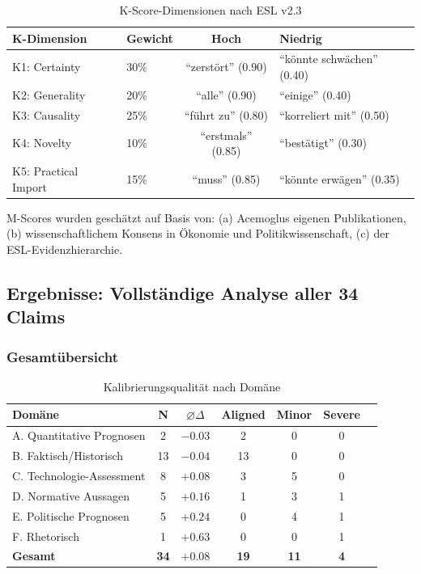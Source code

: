 \begin{table}[H]
\centering
\caption{K-Score-Dimensionen nach ESL v2.3}
\small
\begin{tabular}{llcl}
\toprule
\textbf{K-Dimension} & \textbf{Gewicht} & \textbf{Hoch} & \textbf{Niedrig} \\
\midrule
K1: Certainty & 30\% & ``zerst\"ort'' (0.90) & ``k\"onnte schw\"achen'' (0.40) \\
K2: Generality & 20\% & ``alle'' (0.90) & ``einige'' (0.40) \\
K3: Causality & 25\% & ``f\"uhrt zu'' (0.80) & ``korreliert mit'' (0.50) \\
K4: Novelty & 10\% & ``erstmals'' (0.85) & ``best\"atigt'' (0.30) \\
K5: Practical Import & 15\% & ``muss'' (0.85) & ``k\"onnte erw\"agen'' (0.35) \\
\bottomrule
\end{tabular}
\end{table}

M-Scores wurden gesch\"atzt auf Basis von: (a) Acemoglus eigenen Publikationen, (b) wissenschaftlichem Konsens in \"Okonomie und Politikwissenschaft, (c) der ESL-Evidenzhierarchie.


\subsection{Ergebnisse: Vollst\"andige Analyse aller 34 Claims}

\subsubsection{Gesamt\"ubersicht}

\begin{table}[H]
\centering
\caption{Kalibrierungsqualit\"at nach Dom\"ane}
\small
\begin{tabular}{lcccccc}
\toprule
\textbf{Dom\"ane} & \textbf{N} & \textbf{$\varnothing\Delta$} & \textbf{Aligned} & \textbf{Minor} & \textbf{Severe} \\
\midrule
A. Quantitative Prognosen & 2 & $-0.03$ & 2 & 0 & 0 \\
B. Faktisch/Historisch & 13 & $-0.04$ & 13 & 0 & 0 \\
C. Technologie-Assessment & 8 & $+0.08$ & 3 & 5 & 0 \\
D. Normative Aussagen & 5 & $+0.16$ & 1 & 3 & 1 \\
E. Politische Prognosen & 5 & $+0.24$ & 0 & 4 & 1 \\
F. Rhetorisch & 1 & $+0.63$ & 0 & 0 & 1 \\
\midrule
\textbf{Gesamt} & \textbf{34} & \textbf{$+0.08$} & \textbf{19} & \textbf{11} & \textbf{4} \\
\bottomrule
\end{tabular}
\end{table}


